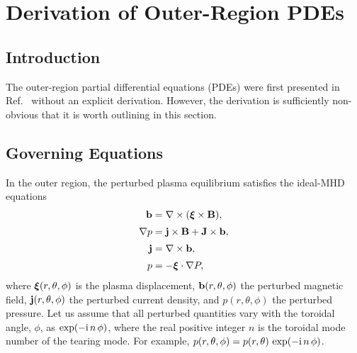 \documentclass[12pt,prb,aps]{revtex4-1}
\newcommand {\bxi}{\mbox{\boldmath$\xi$}}
\begin{document}
\section{Derivation of Outer-Region PDEs}
\subsection{Introduction}
The outer-region partial differential equations (PDEs) were first presented in Ref.~ without an explicit
derivation. However, the derivation is sufficiently non-obvious that it is worth outlining in this section. 

\subsection{Governing Equations}\label{mhd}
In the outer region, the perturbed plasma equilibrium satisfies the  ideal-MHD equations\,\cite{connor,am1,am3,gs1}
\begin{align}
{\bf b} &= \nabla\times (\bxi\times {\bf B}),\label{e21}\\[0.5ex]
\nabla p &={\bf j}\times {\bf B}  +{\bf J}\times {\bf b},\label{e22}\\[0.5ex]
{\bf j} &= \nabla\times {\bf b},\label{e23}\\[0.5ex]
p&= -\bxi\cdot\nabla P,\label{e24}
\end{align}
where $\bxi(r,\theta,\phi)$ is the plasma displacement, ${\bf b}(r,\theta,\phi)$ the perturbed magnetic field,
${\bf j}(r,\theta,\phi)$ the perturbed current density, and $p(r,\theta,\phi)$ the perturbed pressure. 
Let us assume that all perturbed quantities vary with the toroidal angle, $\phi$, as $\exp(-{\rm i}\,n\,\phi)$, where the real positive integer $n$ is the
toroidal mode number of the tearing mode. For example, $p(r,\theta,\phi) = p(r,\theta)\,\exp(-{\rm i}\,n\,\phi)$. 
\end{document}
